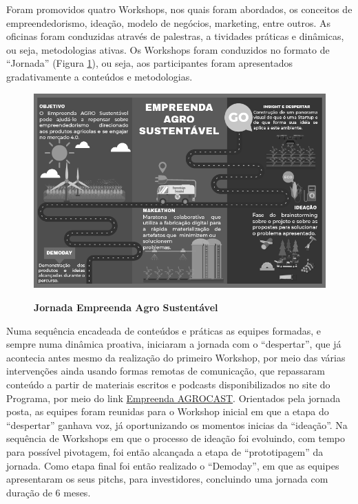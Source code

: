 Foram promovidos quatro Workshops, nos quais foram abordados, os conceitos de empreendedorismo, ideação, modelo de negócios, marketing, entre outros. As oficinas foram conduzidas através de palestras, a    tividades práticas e dinâmicas, ou seja, metodologias ativas. Os Workshops foram conduzidos no formato de “Jornada” (Figura \ref{figura_17}), ou seja, aos participantes foram apresentados gradativamente a conteúdos e metodologias. 


\begin{figure}[H]
\centering
\caption{\textbf{Jornada Empreenda Agro Sustentável}}
\includegraphics[scale=0.6]{Imagens/jornada.png}
\label{figura_17}
\end{figure}

Numa sequência encadeada de conteúdos e práticas as equipes formadas, e sempre numa dinâmica proativa, iniciaram a jornada com o “despertar”, que já acontecia antes mesmo da realização do primeiro Workshop, por meio das várias intervenções ainda usando formas remotas de comunicação, que repassaram conteúdo a partir de materiais escritos e podcasts disponibilizados no site do Programa, por meio do link  \href{https://open.spotify.com/show/3c25hRSxvaCFPw6Y3lX3i1?si=9H_fGz_uRgGiFNhAcdr4rQ}{Empreenda AGROCAST}. Orientados pela jornada posta, as equipes foram reunidas para o Workshop inicial em que a etapa do “despertar” ganhava voz, já oportunizando os momentos inicias da “ideação”. Na sequência de Workshops em que o processo de ideação foi evoluindo, com tempo para possível pivotagem, foi então alcançada a etapa de “prototipagem” da jornada. Como etapa final foi então realizado o “Demoday”, em que as equipes apresentaram os seus pitchs, para investidores, concluindo uma jornada com duração de 6 meses.


